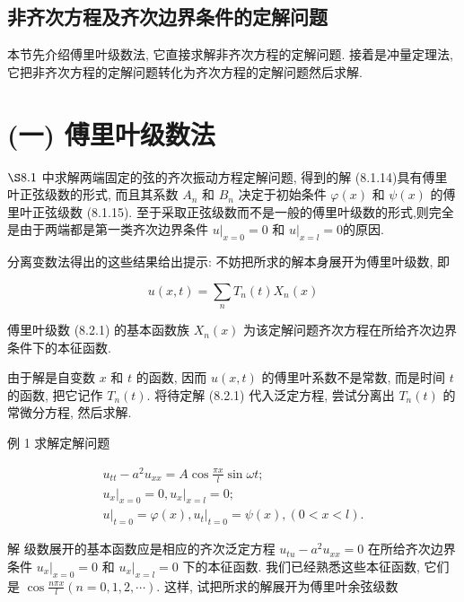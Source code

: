 \begin{solution}
\begin{enumerate}
\end{enumerate}





\subsection{非齐次方程及齐次边界条件的定解问题}



本节先介绍傅里叶级数法, 它直接求解非齐次方程的定解问题. 
接着是冲量定理法, 它把非齐次方程的定解问题转化为齐次方程的定解问题然后求解.

\section{(一) 傅里叶级数法}
$\S 8.1$ 中求解两端固定的弦的齐次振动方程定解问题, 得到的解 (8.1.14)具有傅里叶正弦级数的形式, 而且其系数 $A_{n}$ 和 $B_{n}$ 决定于初始条件 $\varphi(x)$ 和 $\psi(x)$ 的傅里叶正弦级数 (8.1.15). 至于采取正弦级数而不是一般的傅里叶级数的形式,则完全是由于两端都是第一类齐次边界条件 $\left.u\right|_{x=0}=0$ 和 $\left.u\right|_{x=l}=0$的原因.

分离变数法得出的这些结果给出提示: 不妨把所求的解本身展开为傅里叶级数, 即

$$
u(x, t)=\sum_{n} T_{n}(t) X_{n}(x)
$$

傅里叶级数 (8.2.1) 的基本函数族 $X_{n}(x)$ 为该定解问题齐次方程在所给齐次边界条件下的本征函数.

由于解是自变数 $x$ 和 $t$ 的函数, 因而 $u(x, t)$ 的傅里叶系数不是常数, 而是时间 $t$ 的函数, 把它记作 $T_{n}(t)$. 将待定解 (8.2.1) 代入泛定方程, 尝试分离出 $T_{n}(t)$ 的常微分方程, 然后求解.

例 1 求解定解问题

$$
\begin{gathered}
u_{t t}-a^{2} u_{x x}=A \cos \frac{\pi x}{l} \sin \omega t ; \\
\left.u_{x}\right|_{x=0}=0,\left.u_{x}\right|_{x=l}=0 ; \\
\left.u\right|_{t=0}=\varphi(x),\left.u_{t}\right|_{t=0}=\psi(x),(0<x<l) .
\end{gathered}
$$

解 级数展开的基本函数应是相应的齐次泛定方程 $u_{t u}-a^{2} u_{x x}=0$ 在所给齐次边界条件 $\left.u_{x}\right|_{x=0}=0$ 和 $\left.u_{x}\right|_{x=l}=0$ 下的本征函数. 我们已经熟悉这些本征函数, 它们是 $\cos \frac{n \pi x}{l}(n=0,1,2, \cdots)$. 这样, 试把所求的解展开为傅里叶余弦级数


\end{solution}
